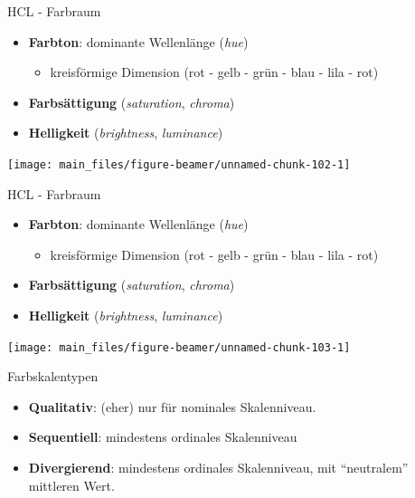 \documentclass[
  10pt,
  ignorenonframetext,
]{beamer}
\providecommand{\tightlist}{%
  \setlength{\itemsep}{0pt}\setlength{\parskip}{0pt}}
\begin{document}
\begin{frame}{HCL - Farbraum}
\label{hcl---farbraum-2}
\begin{itemize}
\tightlist
\item
  \textbf{Farbton}: dominante Wellenlänge (\emph{hue})

  \begin{itemize}
  \tightlist
  \item
    kreisförmige Dimension (rot - gelb - grün - blau - lila - rot)
  \end{itemize}
\item
  \textbf{Farbsättigung} (\emph{saturation}, \emph{chroma})\\
\item
  \textbf{Helligkeit} (\emph{brightness}, \emph{luminance}) \scriptsize
\end{itemize}

\begin{center}\texttt{[image: main\_files/figure-beamer/unnamed-chunk-102-1]} \end{center}

\normalsize
\end{frame}

\begin{frame}{HCL - Farbraum}
\label{hcl---farbraum-3}
\begin{itemize}
\tightlist
\item
  \textbf{Farbton}: dominante Wellenlänge (\emph{hue})

  \begin{itemize}
  \tightlist
  \item
    kreisförmige Dimension (rot - gelb - grün - blau - lila - rot)
  \end{itemize}
\item
  \textbf{Farbsättigung} (\emph{saturation}, \emph{chroma})
\item
  \textbf{Helligkeit} (\emph{brightness}, \emph{luminance}) \scriptsize
\end{itemize}

\begin{center}\texttt{[image: main\_files/figure-beamer/unnamed-chunk-103-1]} \end{center}

\normalsize
\end{frame}

\begin{frame}{Farbskalentypen}
\label{farbskalentypen}
\begin{itemize}
\tightlist
\item
  \textbf{Qualitativ}: (eher) nur für nominales Skalenniveau.
\item
  \textbf{Sequentiell}: mindestens ordinales Skalenniveau
\item
  \textbf{Divergierend}: mindestens ordinales Skalenniveau, mit
  ``neutralem'' mittleren Wert.
\end{itemize}
\end{frame}
\end{document}
